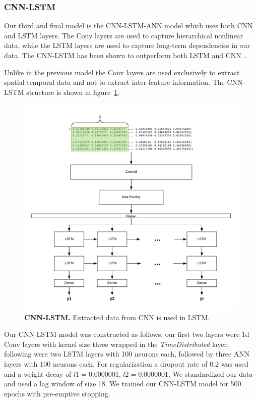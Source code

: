 \documentclass[12pt,journal,compsoc]{IEEEtran}
\begin{document}
\subsubsection{CNN-LSTM}
\par Our third and final model is the CNN-LSTM-ANN model which uses both CNN and LSTM layers. The Conv layers are used to capture hierarchical nonlinear data, while the LSTM layers are used to capture long-term dependencies in our data. The CNN-LSTM has been shown to outperform both LSTM and CNN~\cite{carbon}.
\par Unlike in the previous model the Conv layers are used exclusively to extract spatial temporal data and not to extract inter-feature information.
The CNN-LSTM structure is shown in figure~\ref{fig:cnn_lstm-def}.
\begin{figure}[!ht]\centering
	\includegraphics[width=\linewidth]{images/CNN_LSTM.png}
	\caption{\textbf{CNN-LSTM.} Extracted data from CNN is used in LSTM.}
	\label{fig:cnn_lstm-def}
\end{figure}
\par Our CNN-LSTM model was constructed as follows: our first two layers were 1d Conv layers  with kernel size three wrapped in the \textit{TimeDistributed} layer, following were two LSTM layers with 100 neurons each, followed by three ANN layers with 100 neurons each.
For regularization a dropout rate of 0.2 was used and a weight decay of $l1=0.0000001$, $l2=0.0000001$.
We standardized our data and used a lag window of size 18.
We trained our CNN-LSTM model for 500 epochs with pre-emptive stopping.
\end{document}
